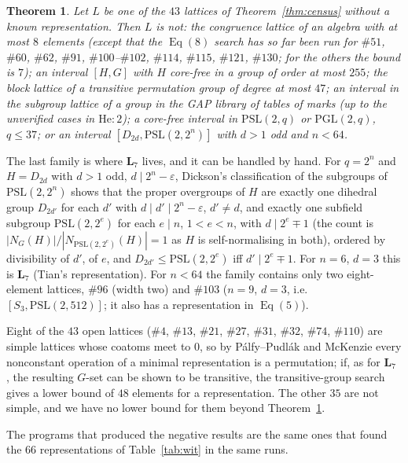 \documentclass[11pt]{article}
\newtheorem{theorem}{Theorem}
\theoremstyle{remark}
\newcommand{\Eq}{\operatorname{Eq}}
\newcommand{\LL}{\mathbf{L}_7}
\newcommand{\lat}[1]{\##1}
\begin{document}
\begin{theorem}\label{thm:neg}
Let $L$ be one of the $43$ lattices of Theorem~\ref{thm:census} without a known representation.
Then $L$ is not: the congruence lattice of an algebra with at most $8$ elements
(except that the $\Eq(8)$ search has so far been run for $\lat{51}$, $\lat{60}$, $\lat{62}$,
$\lat{91}$, $\lat{100}$--$\lat{102}$, $\lat{114}$, $\lat{115}$, $\lat{121}$, $\lat{130}$; for the
others the bound is $7$); an interval $[H,G]$ with $H$ core-free in a group of order at most
$255$; the block lattice of a transitive permutation group of degree at most $47$; an interval in
the subgroup lattice of a group in the GAP library of tables of marks (up to the unverified cases in
$\mathrm{He}{:}2$); a core-free interval in $\mathrm{PSL}(2,q)$ or $\mathrm{PGL}(2,q)$, $q\le 37$; or an interval
$[D_{2d},\mathrm{PSL}(2,2^n)]$ with $d>1$ odd and $n<64$.
\end{theorem}

The last family is where $\LL$ lives, and it can be handled by hand. For $q=2^n$ and $H=D_{2d}$
with $d>1$ odd, $d\mid 2^n-\varepsilon$, Dickson's classification of the subgroups of
$\mathrm{PSL}(2,2^n)$ shows that the proper overgroups of $H$ are exactly one dihedral group
$D_{2d'}$ for each $d'$ with $d\mid d'\mid 2^n-\varepsilon$, $d'\ne d$, and exactly one subfield
subgroup $\mathrm{PSL}(2,2^e)$ for each $e\mid n$, $1<e<n$, with $d\mid 2^e\mp 1$ (the count is
$|N_G(H)|/|N_{\mathrm{PSL}(2,2^e)}(H)|=1$ as $H$ is self-normalising in both), ordered by divisibility
of $d'$, of $e$, and $D_{2d'}\le\mathrm{PSL}(2,2^e)$ iff $d'\mid 2^e\mp1$. For $n=6$, $d=3$ this is
$\LL$ (Tian's representation). For $n<64$ the family contains only two eight-element lattices,
$\lat{96}$ (width two) and $\lat{103}$ ($n=9$, $d=3$, i.e.\ $[S_3,\mathrm{PSL}(2,512)]$; it also has
a representation in $\Eq(5)$).

Eight of the $43$ open lattices ($\lat4$, $\lat{13}$, $\lat{21}$, $\lat{27}$, $\lat{31}$,
$\lat{32}$, $\lat{74}$, $\lat{110}$) are simple lattices whose coatoms meet to $0$, so by
P\'alfy--Pudl\'ak and McKenzie every nonconstant operation of a minimal representation is a
permutation; if, as for $\LL$ \cite{DeMeoFreese}, the resulting $G$-set can be shown to be
transitive, the transitive-group search gives a lower bound of $48$ elements for a representation.
The other $35$ are not simple, and we have no lower bound for them beyond Theorem~\ref{thm:neg}.

The programs that produced the negative results are the same ones that found the $66$
representations of Table~\ref{tab:wit} in the same runs.
\end{document}
